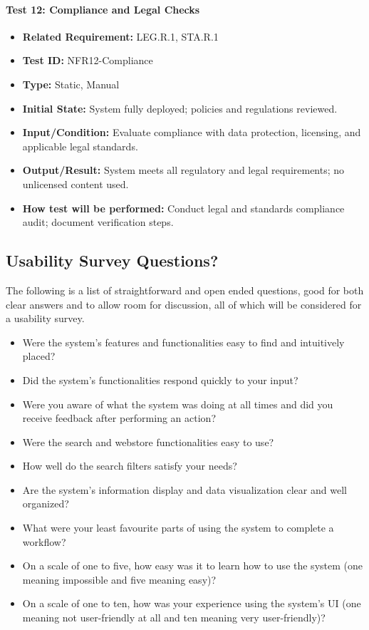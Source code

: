 \documentclass[12pt, titlepage]{article}
\begin{document}
\paragraph{Test 12: Compliance and Legal Checks}
\begin{itemize}
    \item \textbf{Related Requirement:} LEG.R.1, STA.R.1
    \item \textbf{Test ID:} NFR12-Compliance
    \item \textbf{Type:} Static, Manual
    \item \textbf{Initial State:} System fully deployed; policies and regulations reviewed.
    \item \textbf{Input/Condition:} Evaluate compliance with data protection, licensing, and applicable legal standards.
    \item \textbf{Output/Result:} System meets all regulatory and legal requirements; no unlicensed content used.
    \item \textbf{How test will be performed:} Conduct legal and standards compliance audit; document verification steps.
\end{itemize}


\subsection{Usability Survey Questions?}

\par{The following is a list of straightforward and open ended questions, good for both clear answers and to allow room for discussion, 
all of which will be considered for a usability survey.}

\begin{itemize}
  \item{Were the system's features and functionalities easy to find and intuitively placed?}
  \item{Did the system's functionalities respond quickly to your input?}
  \item{Were you aware of what the system was doing at all times and did you receive feedback after performing an action?}
  \item{Were the search and webstore functionalities easy to use?}
  \item{How well do the search filters satisfy your needs?}
  \item{Are the system's information display and data visualization clear and well organized?}
  \item{What were your least favourite parts of using the system to complete a workflow?}
  \item{On a scale of one to five, how easy was it to learn how to use the system (one meaning impossible and five meaning easy)?}
  \item{On a scale of one to ten, how was your experience using the system's UI (one meaning not user-friendly at all and ten meaning very 
  user-friendly)?}
\end{itemize}
\end{document}
